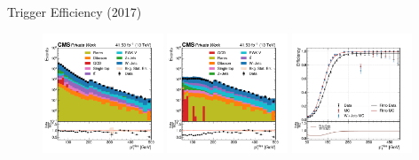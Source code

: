 \begin{frame}[fragile]{Trigger Efficiency (2017)}
  \begin{figure}[htpb]
    \centering
    \includegraphics[width=0.32\textwidth]{fig/trigger/Misc-MET-Trigger-Eff_2017_den.pdf}
    \includegraphics[width=0.32\textwidth]{fig/trigger/Misc-MET-Trigger-Eff_2017_num.pdf}
    \includegraphics[width=0.32\textwidth]{fig/trigger/Misc-MET-Trigger-Eff_2017_eff.pdf}
  \end{figure}	
\end{frame}


